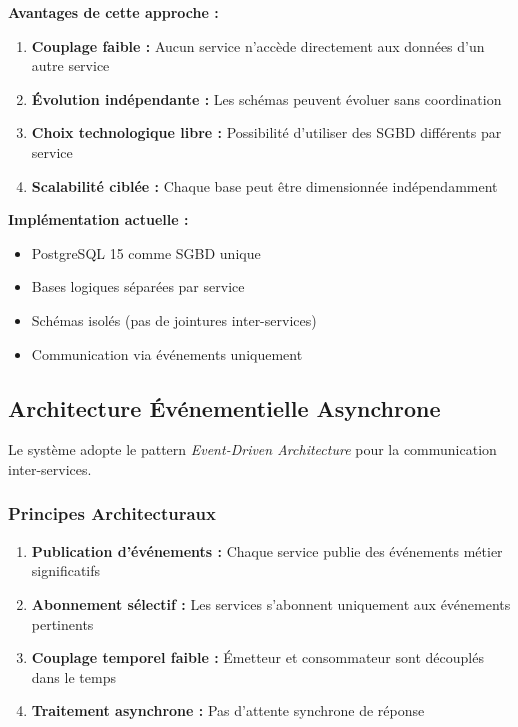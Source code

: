 \documentclass[12pt,a4paper]{article}
\begin{document}
\textbf{Avantages de cette approche :}

\begin{enumerate}
    \item \textbf{Couplage faible :} Aucun service n'accède directement aux données d'un autre service
    \item \textbf{Évolution indépendante :} Les schémas peuvent évoluer sans coordination
    \item \textbf{Choix technologique libre :} Possibilité d'utiliser des SGBD différents par service
    \item \textbf{Scalabilité ciblée :} Chaque base peut être dimensionnée indépendamment
\end{enumerate}

\textbf{Implémentation actuelle :}

\begin{itemize}
    \item PostgreSQL 15 comme SGBD unique
    \item Bases logiques séparées par service
    \item Schémas isolés (pas de jointures inter-services)
    \item Communication via événements uniquement
\end{itemize}

\subsection{Architecture Événementielle Asynchrone}

Le système adopte le pattern \textit{Event-Driven Architecture} pour la communication inter-services.

\subsubsection{Principes Architecturaux}

\begin{enumerate}
    \item \textbf{Publication d'événements :} Chaque service publie des événements métier significatifs
    \item \textbf{Abonnement sélectif :} Les services s'abonnent uniquement aux événements pertinents
    \item \textbf{Couplage temporel faible :} Émetteur et consommateur sont découplés dans le temps
    \item \textbf{Traitement asynchrone :} Pas d'attente synchrone de réponse
\end{enumerate}
\end{document}
